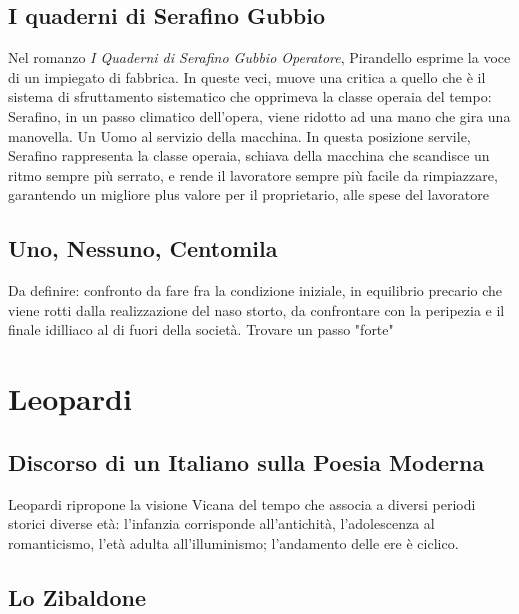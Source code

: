 \documentclass{article}
\begin{document}
\subsection{I quaderni di Serafino Gubbio} %
\label{sub:I quaderni di Serafino Gubbio}
Nel romanzo \textit{I Quaderni di Serafino Gubbio Operatore}\cite{quaderni_serafino}, Pirandello esprime la voce di un impiegato di fabbrica. In queste
veci, muove una critica a quello che è il sistema di sfruttamento sistematico che opprimeva la classe operaia del tempo: Serafino,
in un passo climatico dell'opera, viene ridotto ad una mano che gira una manovella. Un Uomo al servizio della macchina. In questa
posizione servile, Serafino rappresenta la classe operaia, schiava della macchina che scandisce un ritmo sempre più serrato,
e rende il lavoratore sempre più facile da rimpiazzare, garantendo un migliore plus valore per il proprietario, alle spese del
lavoratore

\subsection{Uno, Nessuno, Centomila} %
\label{sub:Uno Nessuno Centomila}
Da definire: confronto da fare fra la condizione iniziale, in equilibrio precario che viene rotti dalla realizzazione del
naso storto, da confrontare con la peripezia e il finale idilliaco al di fuori della società. Trovare un passo "forte"


\section{Leopardi} %
\label{sec:Leopardi}
\subsection{Discorso di un Italiano sulla Poesia Moderna} %
Leopardi ripropone la visione Vicana del tempo che associa a diversi periodi storici diverse età: l'infanzia corrisponde
all'antichità, l'adolescenza al romanticismo, l'età adulta all'illuminismo; l'andamento delle ere è ciclico. 
\label{sub:Discorso di un Italiano sulla Poesia Moderna}
\subsection{Lo Zibaldone} %
\label{sub:Lo Zibaldone}
\end{document}
